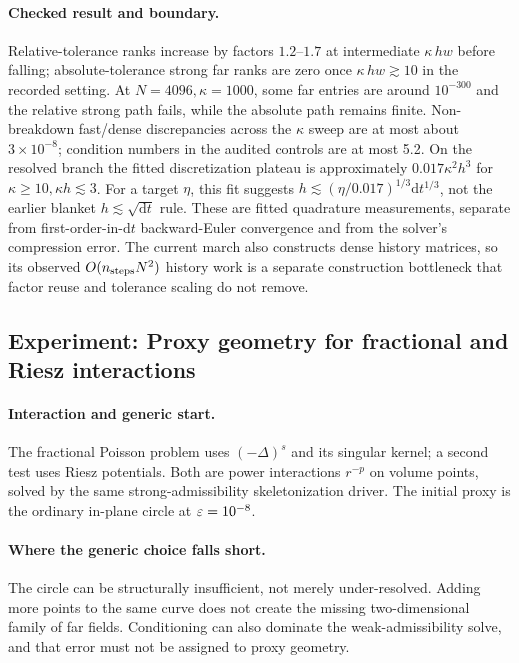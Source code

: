 \paragraph{Checked result and boundary.} Relative-tolerance ranks increase by factors $1.2$--$1.7$ at intermediate $\kappa\,hw$ before falling; absolute-tolerance strong far ranks are zero once $\kappa\,hw\gtrsim10$ in the recorded setting. At $N=4096,\kappa=1000$, some far entries are around $10^{-300}$ and the relative strong path fails, while the absolute path remains finite. Non-breakdown fast/dense discrepancies across the $\kappa$ sweep are at most about $3\times10^{-8}$; condition numbers in the audited controls are at most 5.2. On the resolved branch the fitted discretization plateau is approximately $0.017\kappa^2h^3$ for $\kappa\ge10,\kappa h\lesssim3$. For a target $\eta$, this fit suggests $h\lesssim(\eta/0.017)^{1/3}\mathrm dt^{1/3}$, not the earlier blanket $h\lesssim\sqrt{\mathrm dt}$ rule. These are fitted quadrature measurements, separate from first-order-in-$\mathrm dt$ backward-Euler convergence and from the solver's compression error. The current march also constructs dense history matrices, so its observed $O(n_{\rm steps}N^2)$ history work is a separate construction bottleneck that factor reuse and tolerance scaling do not remove.

\subsection{Experiment: Proxy geometry for fractional and Riesz interactions}
\label{exp:e8}
\paragraph{Interaction and generic start.} The fractional Poisson problem uses $(-\Delta)^s$ and its singular kernel; a second test uses Riesz potentials. Both are power interactions $r^{-p}$ on volume points, solved by the same strong-admissibility skeletonization driver. The initial proxy is the ordinary in-plane circle at $\varepsilon=10^{-8}$.

\paragraph{Where the generic choice falls short.} The circle can be structurally insufficient, not merely under-resolved. Adding more points to the same curve does not create the missing two-dimensional family of far fields. Conditioning can also dominate the weak-admissibility solve, and that error must not be assigned to proxy geometry.

